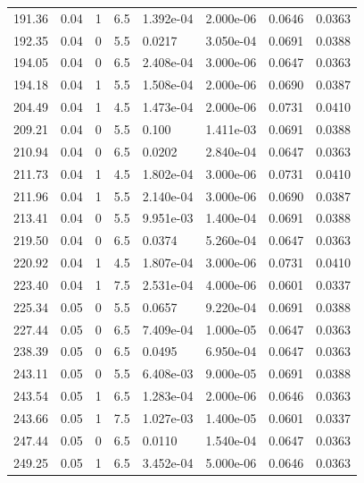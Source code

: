 \documentclass[preview]{standalone}
\begin{document}
{{{\begin{tabular}{L{1.2cm}C{1.2cm} C{0.3cm}C{0.5cm} C{1.4cm}C{1.4cm} C{1.4cm}C{1.4cm}}
  191.36  &  0.04  & 1     & 6.5 &  1.392e-04  & 2.000e-06  & 0.0646 &  0.0363   \\ 
  192.35  &  0.04  & 0     & 5.5 &  0.0217  & 3.050e-04  & 0.0691 &  0.0388   \\ 
  194.05  &  0.04  & 0     & 6.5 &  2.408e-04  & 3.000e-06  & 0.0647 &  0.0363   \\ 
  194.18  &  0.04  & 1     & 5.5 &  1.508e-04  & 2.000e-06  & 0.0690 &  0.0387   \\ 
  204.49  &  0.04  & 1     & 4.5 &  1.473e-04  & 2.000e-06  & 0.0731 &  0.0410   \\ 
  209.21  &  0.04  & 0     & 5.5 &  0.100  & 1.411e-03  & 0.0691 &  0.0388   \\ 
  210.94  &  0.04  & 0     & 6.5 &  0.0202  & 2.840e-04  & 0.0647 &  0.0363   \\ 
  211.73  &  0.04  & 1     & 4.5 &  1.802e-04  & 3.000e-06  & 0.0731 &  0.0410   \\ 
  211.96  &  0.04  & 1     & 5.5 &  2.140e-04  & 3.000e-06  & 0.0690 &  0.0387   \\ 
  213.41  &  0.04  & 0     & 5.5 &  9.951e-03  & 1.400e-04  & 0.0691 &  0.0388   \\ 
  219.50  &  0.04  & 0     & 6.5 &  0.0374  & 5.260e-04  & 0.0647 &  0.0363   \\ 
  220.92  &  0.04  & 1     & 4.5 &  1.807e-04  & 3.000e-06  & 0.0731 &  0.0410   \\ 
  223.40  &  0.04  & 1     & 7.5 &  2.531e-04  & 4.000e-06  & 0.0601 &  0.0337   \\ 
  225.34  &  0.05  & 0     & 5.5 &  0.0657  & 9.220e-04  & 0.0691 &  0.0388   \\ 
  227.44  &  0.05  & 0     & 6.5 &  7.409e-04  & 1.000e-05  & 0.0647 &  0.0363   \\ 
  238.39  &  0.05  & 0     & 6.5 &  0.0495  & 6.950e-04  & 0.0647 &  0.0363   \\ 
  243.11  &  0.05  & 0     & 5.5 &  6.408e-03  & 9.000e-05  & 0.0691 &  0.0388   \\ 
  243.54  &  0.05  & 1     & 6.5 &  1.283e-04  & 2.000e-06  & 0.0646 &  0.0363   \\ 
  243.66  &  0.05  & 1     & 7.5 &  1.027e-03  & 1.400e-05  & 0.0601 &  0.0337   \\ 
  247.44  &  0.05  & 0     & 6.5 &  0.0110  & 1.540e-04  & 0.0647 &  0.0363   \\ 
  249.25  &  0.05  & 1     & 6.5 &  3.452e-04  & 5.000e-06  & 0.0646 &  0.0363   \\ 

\end{tabular}}}}
\end{document}
